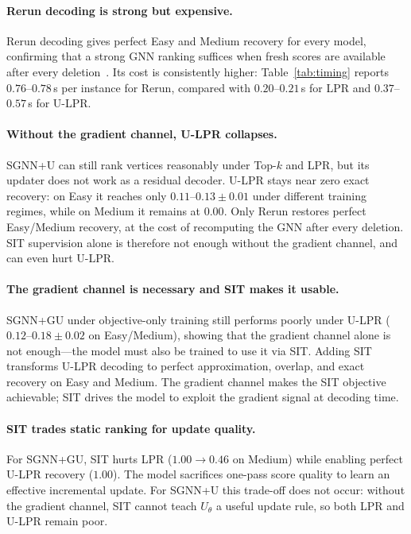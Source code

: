 \documentclass[11pt]{article}
\theoremstyle{plain}
\theoremstyle{remark}
\theoremstyle{plain}
\begin{document}
\paragraph{Rerun decoding is strong but expensive.}
Rerun decoding gives perfect Easy and Medium recovery for every model,
confirming that a strong GNN ranking suffices when fresh scores are available after
every deletion~\citep{shoham2026ltr}. Its cost is consistently higher:
Table~\ref{tab:timing} reports $0.76$--$0.78$\,s per instance for Rerun,
compared with $0.20$--$0.21$\,s for LPR and $0.37$--$0.57$\,s for U-LPR.

\paragraph{Without the gradient channel, U-LPR collapses.}
SGNN+U can still rank vertices reasonably under Top-$k$ and LPR, but its updater
does not work as a residual decoder. U-LPR stays near zero exact recovery: on Easy
it reaches only $0.11$--$0.13{\pm}0.01$ under different training regimes, while on
Medium it remains at $0.00$. Only Rerun restores perfect Easy/Medium recovery,
at the cost of recomputing the GNN after every deletion. SIT supervision alone is
therefore not enough without the gradient channel, and can even hurt U-LPR.

\paragraph{The gradient channel is necessary and SIT makes it usable.}
SGNN+GU under objective-only training still performs poorly under U-LPR
($0.12$--$0.18{\pm}0.02$ on Easy/Medium), showing that the gradient channel alone
is not enough---the model must also be trained to use it via SIT. Adding SIT
transforms U-LPR decoding to perfect approximation, overlap, and exact recovery on
Easy and Medium. The gradient channel makes the SIT objective achievable; SIT drives
the model to exploit the gradient signal at decoding time.

\paragraph{SIT trades static ranking for update quality.}
For SGNN+GU, SIT hurts LPR ($1.00\to0.46$ on Medium) while enabling perfect U-LPR
recovery ($1.00$). The model sacrifices one-pass score quality to learn an effective
incremental update. For SGNN+U this trade-off does not occur: without the gradient
channel, SIT cannot teach $U_\theta$ a useful update rule, so both LPR and U-LPR
remain poor.
\end{document}
